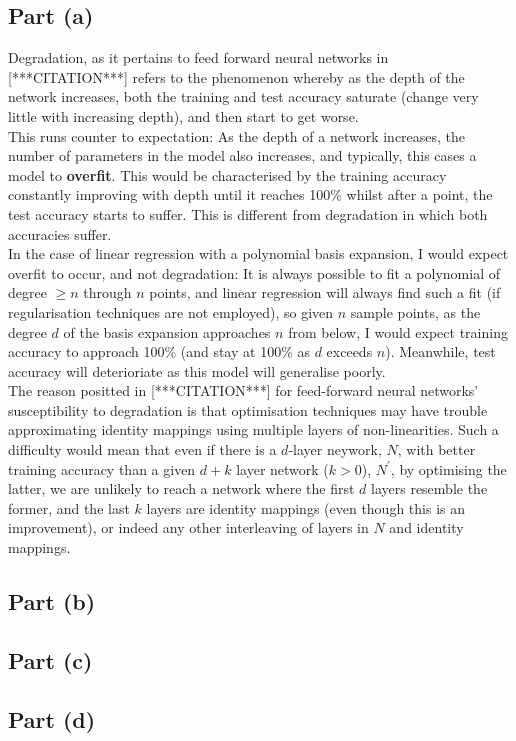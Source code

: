 \subsection{Part (a)}

Degradation, as it pertains to feed forward neural networks in [***CITATION***] refers to the phenomenon whereby as the depth of the network increases, both the training and test accuracy saturate (change very little with increasing depth), and then start to get worse.\\[1em]

This runs counter to expectation: As the depth of a network increases, the number of parameters in the model also increases, and typically, this cases a model to \textbf{overfit}. This would be characterised by the training accuracy constantly improving with depth until it reaches 100\% whilst after a point, the test accuracy starts to suffer. This is different from degradation in which both accuracies suffer.\\[1em]

In the case of linear regression with a polynomial basis expansion, I would expect overfit to occur, and not degradation: It is always possible to fit a polynomial of degree $\geq n$ through $n$ points, and linear regression will always find such a fit (if regularisation techniques are not employed), so given $n$ sample points, as the degree $d$ of the basis expansion approaches $n$ from below, I would expect training accuracy to approach 100\% (and stay at 100\% as $d$ exceeds $n$). Meanwhile, test accuracy will deterioriate as this model will generalise poorly.\\[1em]

The reason positted in [***CITATION***] for feed-forward neural networks' susceptibility to degradation is that optimisation techniques may have trouble approximating identity mappings using multiple layers of non-linearities. Such a difficulty would mean that even if there is a $d$-layer neywork, $N$, with better training accuracy than a given $d+k$ layer network ($k > 0$), $N^\prime$, by optimising the latter, we are unlikely to reach a network where the first $d$ layers resemble the former, and the last $k$ layers are identity mappings (even though this is an improvement), or indeed any other interleaving of layers in $N$ and identity mappings.

\subsection{Part (b)}

\subsection{Part (c)}

\subsection{Part (d)}
